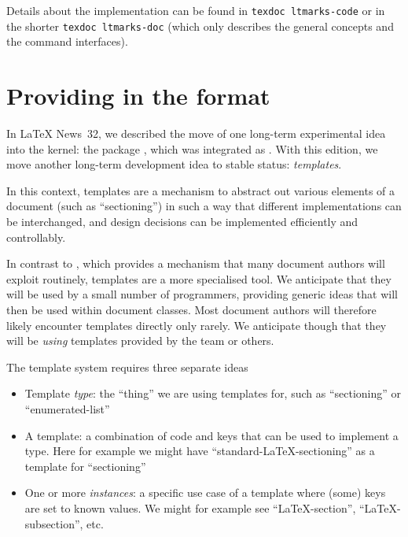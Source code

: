 \documentclass{ltnews}
\begin{document}
Details about the implementation can be found in \texttt{texdoc
  ltmarks-code} or in the shorter \texttt{texdoc ltmarks-doc} (which
only describes the general concepts and  the command interfaces).


\section{Providing  in the format}

In \LaTeX{} News~32, we described the move of one long-term experimental idea
into the kernel: the package , which was integrated as .
With this edition, we move another long-term development idea to stable status:
\emph{templates}.

In this context, templates are a mechanism to abstract out various elements
of a document (such as \enquote{sectioning}) in such a way that different
implementations can be interchanged,
and design decisions can be implemented efficiently and controllably.

In contrast to , which provides a mechanism that many document
authors will exploit routinely, templates are a more specialised tool. We
anticipate that they will be used by a small number of programmers, providing
generic ideas that will then be used within document classes. Most document
authors will therefore likely encounter templates directly only rarely.
We anticipate though that they will be \emph{using} templates provided
by the team or others.


The template system requires three separate ideas
\begin{itemize}
  \item Template \emph{type}: the \enquote{thing} we are using templates
    for, such as \enquote{sectioning} or \enquote{enumerated-list}
  \item A template: a combination of code and keys that can be used
    to implement a type. Here for example we might have
    \enquote{standard-\LaTeX{}-sectioning} as a template for 
    \enquote{sectioning}
  \item One or more \emph{instances}: a specific use case of a template
    where (some) keys are set to known values. We might for example see
    \enquote{\LaTeX{}-section}, \enquote{\LaTeX{}-subsection}, etc.
\end{itemize}
\end{document}
